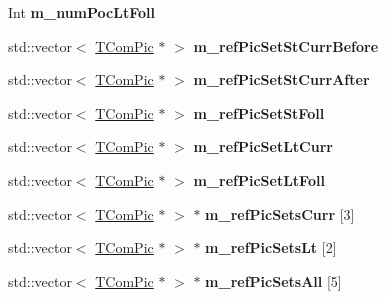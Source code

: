 \begin{DoxyCompactItemize}
Int {\bfseries m\+\_\+num\+Poc\+Lt\+Foll}
\item 
\mbox{\label{class_t_com_decoded_rps_aa7a69e74d8ab8a63a96741028c3659a0}} 
std\+::vector$<$ \hyperlink{class_t_com_pic}{T\+Com\+Pic} $\ast$ $>$ {\bfseries m\+\_\+ref\+Pic\+Set\+St\+Curr\+Before}
\item 
\mbox{\label{class_t_com_decoded_rps_af98067f1b90ad5df10d2cf1010daac31}} 
std\+::vector$<$ \hyperlink{class_t_com_pic}{T\+Com\+Pic} $\ast$ $>$ {\bfseries m\+\_\+ref\+Pic\+Set\+St\+Curr\+After}
\item 
\mbox{\label{class_t_com_decoded_rps_a98965c10db85061f21844a3aaf0a69ff}} 
std\+::vector$<$ \hyperlink{class_t_com_pic}{T\+Com\+Pic} $\ast$ $>$ {\bfseries m\+\_\+ref\+Pic\+Set\+St\+Foll}
\item 
\mbox{\label{class_t_com_decoded_rps_a17edd0f701143ddfc315a40261274515}} 
std\+::vector$<$ \hyperlink{class_t_com_pic}{T\+Com\+Pic} $\ast$ $>$ {\bfseries m\+\_\+ref\+Pic\+Set\+Lt\+Curr}
\item 
\mbox{\label{class_t_com_decoded_rps_a5ad876058fb6651ba1fd999ad55ab87a}} 
std\+::vector$<$ \hyperlink{class_t_com_pic}{T\+Com\+Pic} $\ast$ $>$ {\bfseries m\+\_\+ref\+Pic\+Set\+Lt\+Foll}
\item 
\mbox{\label{class_t_com_decoded_rps_af545c684387fe8fcf8a615d88ff01429}} 
std\+::vector$<$ \hyperlink{class_t_com_pic}{T\+Com\+Pic} $\ast$ $>$ $\ast$ {\bfseries m\+\_\+ref\+Pic\+Sets\+Curr} \mbox{[}3\mbox{]}
\item 
\mbox{\label{class_t_com_decoded_rps_a483b2b7a6178db4cd71da9042e577f60}} 
std\+::vector$<$ \hyperlink{class_t_com_pic}{T\+Com\+Pic} $\ast$ $>$ $\ast$ {\bfseries m\+\_\+ref\+Pic\+Sets\+Lt} \mbox{[}2\mbox{]}
\item 
\mbox{\label{class_t_com_decoded_rps_a7e45c1250918f036cb1f7519ae4e862f}} 
std\+::vector$<$ \hyperlink{class_t_com_pic}{T\+Com\+Pic} $\ast$ $>$ $\ast$ {\bfseries m\+\_\+ref\+Pic\+Sets\+All} \mbox{[}5\mbox{]}
\item 
\mbox{\label{class_t_com_decoded_rps_a3f559c81595b6ae151f64d7db6e3bf65}} 

\end{DoxyCompactItemize}
